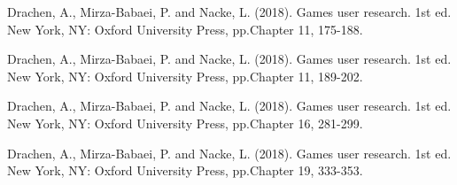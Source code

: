 \documentclass[journal]{IEEEtran}
\begin{document}
\begin{thebibliography}{1}
Drachen, A., Mirza-Babaei, P. and Nacke, L. (2018). Games user research. 1st ed. New York, NY: Oxford University Press, pp.Chapter 11, 175-188.

Drachen, A., Mirza-Babaei, P. and Nacke, L. (2018). Games user research. 1st ed. New York, NY: Oxford University Press, pp.Chapter 11, 189-202.

Drachen, A., Mirza-Babaei, P. and Nacke, L. (2018). Games user research. 1st ed. New York, NY: Oxford University Press, pp.Chapter 16, 281-299.

Drachen, A., Mirza-Babaei, P. and Nacke, L. (2018). Games user research. 1st ed. New York, NY: Oxford University Press, pp.Chapter 19, 333-353.

\end{thebibliography}

% 










\end{document}
